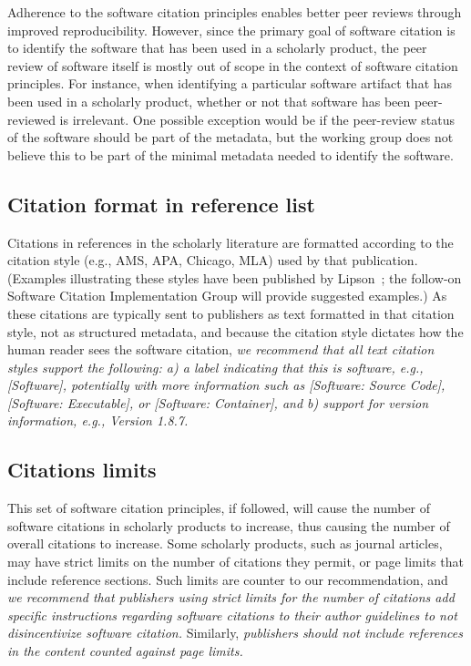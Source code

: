\documentclass[12pt, oneside]{amsart}
\begin{document}
Adherence to the software citation principles enables better peer reviews through improved
reproducibility. However, since the primary goal of software citation is to identify the
software that has been used in a scholarly product, the peer review of software itself is
mostly out of scope in the context of software citation principles. For instance, when
identifying a particular software artifact that has been used in a scholarly product,
whether or not that software has been peer-reviewed is irrelevant. One possible exception
would be if the peer-review status of the software should
be part of the metadata, but the working group does not believe this to be part of the
minimal metadata needed to identify the software.


\subsection{Citation format in reference list}

Citations in references in the scholarly literature are formatted according to the citation
style (e.g., AMS, APA, Chicago, MLA) used by that publication. (Examples illustrating these
styles have been published by Lipson~\cite{lipson2011cite}; the follow-on Software Citation
Implementation Group will provide suggested examples.)  As these citations are typically sent
to publishers as text formatted in that citation style, not as structured metadata, and because
the citation style dictates how the human reader sees the software citation, \textit{we recommend
that all text citation styles support the following:
a) a label indicating that this is software, e.g., [Software], potentially with more information
such as [Software: Source Code], [Software: Executable], or [Software: Container],
and b) support for version information, e.g., Version 1.8.7.}

\subsection{Citations limits}

This set of software citation principles, if followed, will cause the number of software citations in scholarly products to increase, thus causing the number of overall citations to increase.
Some scholarly products, such as journal articles, may have strict limits on the number of citations they permit, or page limits that include reference sections.
Such limits are counter to our recommendation, and \textit{we recommend that publishers using strict limits for the number of citations add specific instructions regarding software citations to their author guidelines to not disincentivize software citation.}
Similarly,  \textit{publishers should not include references in the content counted against page limits.}
\end{document}
